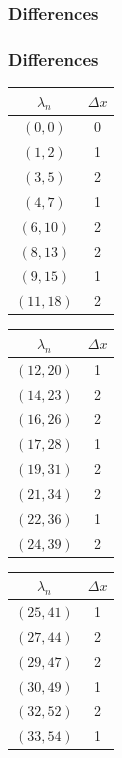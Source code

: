 \documentclass[11pt, letterpaper]{beamer}
\begin{document}
\begin{frame}
	\frametitle{Differences}

\end{frame}

\begin{frame}
	\frametitle{Differences}
	\begin{center}
	\begin{tabular}{|c|c|}
		\hline
		$\lambda_n$ &$\Delta x$\\
		\hline
		$(0,0)$&0\\
		$(1,2)$&1\\
		$(3,5)$&2\\
		$(4,7)$&1\\
		$(6,10)$&2\\
		$(8,13)$&2\\
		$(9,15)$&1\\
		$(11,18)$&2\\
		\hline
	\end{tabular}
	\begin{tabular}{|c|c|}
		\hline
		$\lambda_n$ &$\Delta x$\\
		\hline
		$(12,20)$&1\\
		$(14,23)$&2\\
		$(16,26)$&2\\
		$(17,28)$&1\\
		$(19,31)$&2\\
		$(21,34)$&2\\
		$(22,36)$&1\\
		$(24,39)$&2\\
		\hline
	\end{tabular}
	\begin{tabular}{|c|c|}
		\hline
		$\lambda _n$ &$\Delta x$\\
		\hline
		$(25,41)$&1\\
		$(27,44)$&2\\
		$(29,47)$&2\\
		$(30,49)$&1\\
		$(32,52)$&2\\
		$(33,54)$&1\\
		\hline
	\end{tabular}
	\end{center}
\end{frame}
\end{document}

